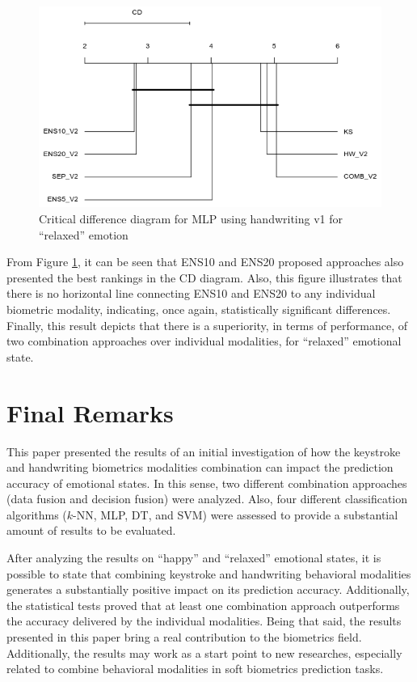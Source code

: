 \documentclass[conference]{IEEEtran}
\begin{document}
\begin{figure}[htbp]
  \centering
  \includegraphics[scale=0.5]{images/mlp_v2_relaxed.png}
  \caption{Critical difference diagram for MLP using handwriting v1 for ``relaxed'' emotion}
  \label{fig:cd-relaxed}
\end{figure}

From Figure \ref{fig:cd-relaxed}, it can be seen that ENS10 and ENS20 proposed approaches also presented
the best rankings in the CD diagram. Also, this figure illustrates that there is no horizontal line connecting ENS10 and ENS20 to any individual biometric modality, indicating, once again, statistically significant differences. Finally, this result depicts that there is a superiority, in terms of performance,  of two combination approaches over individual modalities, for ``relaxed'' emotional state. 


\section{Final Remarks}

This paper presented the results of an initial investigation of how the keystroke and handwriting biometrics modalities combination can impact the prediction accuracy of emotional states. In this sense, two different combination approaches (data fusion and decision fusion) were analyzed. Also, four different classification algorithms ($k$-NN, MLP, DT, and SVM) were assessed to provide a substantial amount of results to be evaluated.

After analyzing the results on ``happy''  and ``relaxed'' emotional states, it is possible to state that combining keystroke and handwriting behavioral modalities generates a substantially positive impact on its prediction accuracy.
Additionally, the statistical tests proved that at least one combination approach outperforms the accuracy delivered by the individual modalities.
Being that said, the results presented in this paper bring a real contribution to the biometrics field. Additionally, the results may work as a start point to new researches, especially related to combine behavioral modalities in soft biometrics prediction tasks.
\end{document}
